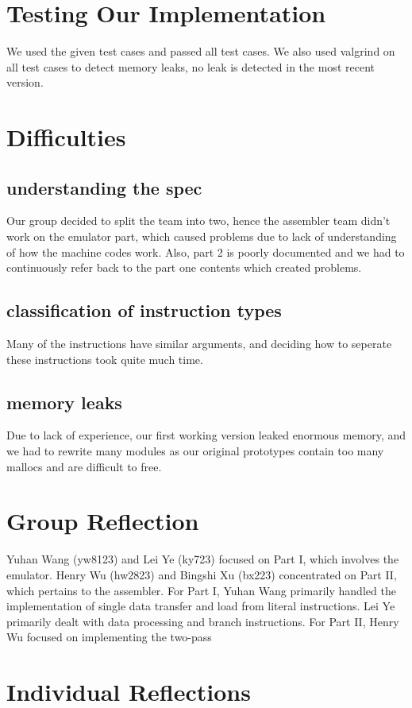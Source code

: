 \documentclass[11pt]{article}
\begin{document}
\section{Testing Our Implementation}

We used the given test cases and passed all test cases.
We also used valgrind on all test cases to detect memory leaks, no leak is detected in the most recent version.

\section{Difficulties}
\subsection{understanding the spec}
Our group decided to split the team into two, hence the assembler team didn't work on the emulator part, which caused problems due to lack of understanding of how the machine codes work.
Also, part 2 is poorly documented and we had to continuously refer back to the part one contents which created problems.
\subsection{classification of instruction types}
Many of the instructions have similar arguments, and deciding how to seperate these instructions took quite much time.
\subsection{memory leaks}
Due to lack of experience, our first working version leaked enormous memory, and we had to rewrite many modules as our original prototypes contain too many mallocs and are difficult to free.


\section{Group Reflection}

Yuhan Wang (yw8123) and Lei Ye (ky723) focused on Part I, which involves the emulator. Henry Wu (hw2823) and Bingshi Xu (bx223) concentrated on Part II, which pertains to the assembler.
For Part I, Yuhan Wang primarily handled the implementation of single data transfer and load from literal instructions. Lei Ye primarily dealt with data processing and branch instructions.
For Part II, Henry Wu focused on implementing the two-pass 

\section{Individual Reflections}
\end{document}
